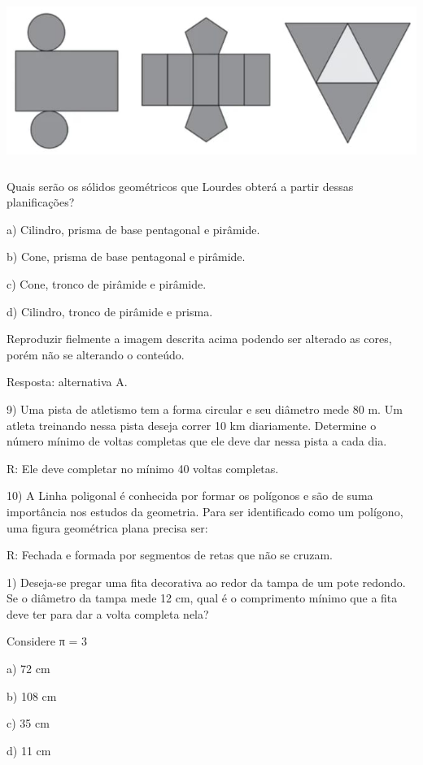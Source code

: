 \includegraphics[width=5.90625in,height=2.125in]{./imgSAEB_6_MAT/media/image51.png}

Quais serão os sólidos geométricos que Lourdes obterá a partir dessas
planificações?

a) Cilindro, prisma de base pentagonal e pirâmide.

b) Cone, prisma de base pentagonal e pirâmide.

c) Cone, tronco de pirâmide e pirâmide.

d) Cilindro, tronco de pirâmide e prisma.

Reproduzir fielmente a imagem descrita acima podendo ser alterado as
cores, porém não se alterando o conteúdo.

Resposta: alternativa A.

9) Uma pista de atletismo tem a forma circular e seu diâmetro mede 80 m.
Um atleta treinando nessa pista deseja correr 10 km diariamente.
Determine o número mínimo de voltas completas que ele deve dar nessa
pista a cada dia.

R: Ele deve completar no mínimo 40 voltas completas.

10) A Linha poligonal é conhecida por formar os polígonos e são de suma
importância nos estudos da geometria. Para ser identificado como um
polígono, uma figura geométrica plana precisa ser:

R: Fechada e formada por segmentos de retas que não se cruzam.


1) Deseja-se pregar uma fita decorativa ao redor da tampa de um pote
redondo. Se o diâmetro da tampa mede 12 cm, qual é o comprimento mínimo
que a fita deve ter para dar a volta completa nela?

Considere π = 3

a) 72 cm

b) 108 cm

c) 35 cm

d) 11 cm

